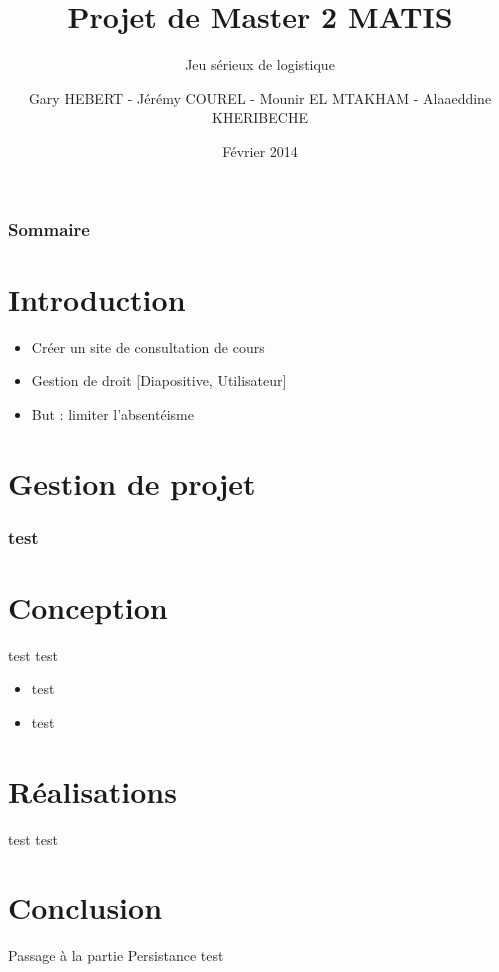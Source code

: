 \documentclass{beamer}
\title{Projet de Master 2 MATIS}
\subtitle{Jeu sérieux de logistique}
\author{Gary HEBERT - Jérémy COUREL - Mounir EL MTAKHAM - Alaaeddine KHERIBECHE}
\date{Février 2014}
\begin{document}
\begin{frame}[plain]
  \titlepage
\end{frame}

\begin{frame}[plain]
 \frametitle{Sommaire}
 \tableofcontents
\end{frame}
\section*{Introduction}
  \begin{frame}
  \begin{itemize}
    \item Créer un site de consultation de cours
    \newline
    \item Gestion de droit [Diapositive, Utilisateur]
    \newline
    \item But : limiter l'absentéisme
  \end{itemize}
  \end{frame}


\section{Gestion de projet}

    \begin{frame}
      \frametitle{test}
      \begin{figure}
      \end{figure}
    \end{frame}



\section{Conception}
\begin{frame}
  \begin{block}{test}
    test
  \end{block}
  \begin{itemize}
    \item test
    \item test
  \end{itemize}
\end{frame}

\section{Réalisations}
	\begin{frame}
		\begin{block}{test}
			test
		\end{block}
	\end{frame}

\section*{Conclusion}
	\begin{frame}
		\begin{block}{Passage à la partie Persistance}
			test
		\end{block}
	\end{frame}
    
\end{document}
